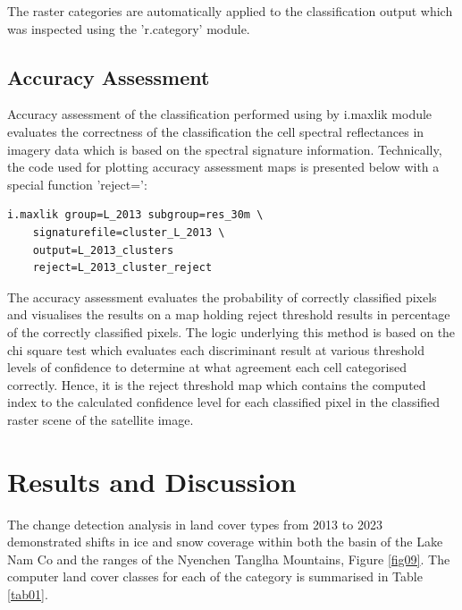 \documentclass[final,5p,times,twocolumn]{elsarticle}
\begin{document}
The raster categories are automatically applied to the classification output which was inspected using the 'r.category' module.

\subsection{Accuracy Assessment}

Accuracy assessment of the classification performed using by i.maxlik module evaluates the correctness of the classification the cell spectral reflectances in imagery data which is based on the spectral signature information. Technically, the code used for plotting accuracy assessment maps is presented below with a special function 'reject=': 

\begin{verbatim}
i.maxlik group=L_2013 subgroup=res_30m \
	signaturefile=cluster_L_2013 \
	output=L_2013_clusters 
	reject=L_2013_cluster_reject 
\end{verbatim}
 
 The accuracy assessment evaluates the probability of correctly classified pixels and visualises the results on a map holding reject threshold results in percentage of the correctly classified pixels. The logic underlying this method is based on the chi square test which evaluates each discriminant result at various threshold levels of confidence to determine at what agreement each cell categorised correctly. Hence, it is the reject threshold map which contains the computed index to the calculated confidence level for each classified pixel in the classified raster scene of the satellite image. 
  
\section{Results and Discussion}

The change detection analysis in land cover types from 2013 to 2023 demonstrated shifts in ice and snow coverage within both the basin of the Lake Nam Co and the ranges of the Nyenchen Tanglha Mountains, Figure \ref{fig09}. The computer land cover classes for each of the category is summarised in Table \ref{tab01}.
\end{document}
